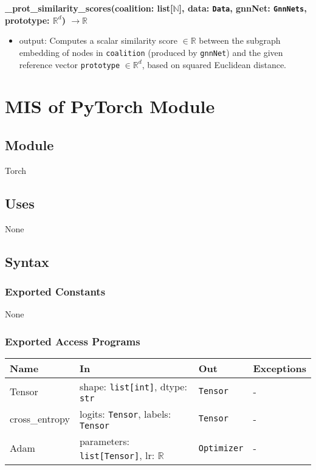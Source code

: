 \documentclass[12pt, titlepage]{article}
\begin{document}
\noindent \textbf{\_prot\_similarity\_scores(coalition: list[\(\mathbb{N}\)], data: \texttt{Data}, gnnNet: \texttt{GnnNets}, prototype: \(\mathbb{R}^d\)) \(\rightarrow \mathbb{R}\)}
\begin{itemize}
  \item output: Computes a scalar similarity score \(\in \mathbb{R}\) between the subgraph embedding of nodes in \texttt{coalition} (produced by \texttt{gnnNet}) and the given reference vector \texttt{prototype} \(\in \mathbb{R}^d\), based on squared Euclidean distance.
\end{itemize}



\newpage



\section{MIS of PyTorch Module} \label{TorchModule}

\subsection{Module}
Torch

\subsection{Uses}
None

\subsection{Syntax}

\subsubsection{Exported Constants}
None

\subsubsection{Exported Access Programs}

\begin{center}
\begin{tabular}{p{3.2cm} >{\raggedright\arraybackslash}p{5.5cm} p{4cm} p{2.5cm}}
\hline
\textbf{Name} & \textbf{In} & \textbf{Out} & \textbf{Exceptions} \\
\hline
Tensor & shape: \texttt{list[int]}, dtype: \texttt{str} & \texttt{Tensor} & - \\
cross\_entropy & logits: \texttt{Tensor}, labels: \texttt{Tensor} & \texttt{Tensor} & - \\
Adam & parameters: \texttt{list[Tensor]}, lr: \(\mathbb{R}\) & \texttt{Optimizer} & - \\
\hline
\end{tabular}
\end{center}
\end{document}
